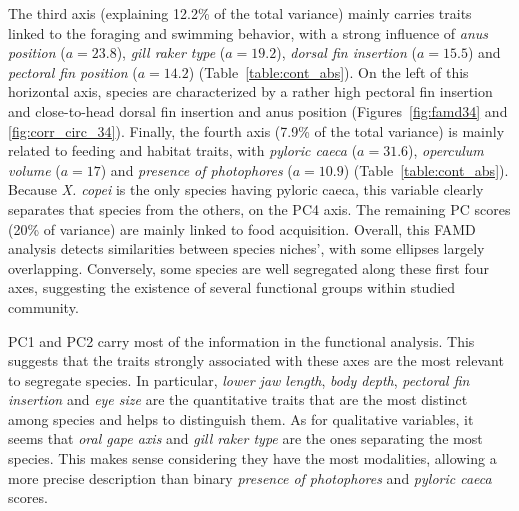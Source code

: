 The third axis (explaining 12.2\% of the total variance) mainly carries traits linked to the foraging and swimming behavior, with a strong influence of \emph{anus position} ($a = 23.8$), \emph{gill raker type} ($a = 19.2$), \emph{dorsal fin insertion} ($a = 15.5$) and \emph{pectoral fin position} ($a = 14.2$) (Table~\ref{table:cont_abs}). On the left of this horizontal axis, species are characterized by a rather high pectoral fin insertion and close-to-head dorsal fin insertion and anus position (Figures~\ref{fig:famd34} and \ref{fig:corr_circ_34}).
Finally, the fourth axis (7.9\% of the total variance) is mainly related to feeding and habitat traits, with \emph{pyloric caeca} ($a = 31.6$), \emph{operculum volume} ($a = 17$) and \emph{presence of photophores} ($a = 10.9$) (Table~\ref{table:cont_abs}). Because \textit{X. copei} is the only species having pyloric caeca, this variable clearly separates that species from the others, on the PC4 axis. The remaining PC scores (20\% of variance) are mainly linked to food acquisition. Overall, this FAMD analysis detects similarities between species niches', with some ellipses largely overlapping. Conversely, some species are well segregated along these first four axes, suggesting the existence of several functional groups within studied community. 

PC1 and PC2 carry most of the information in the functional analysis. This suggests that the traits strongly associated with these axes are the most relevant to segregate species. In particular, \emph{lower jaw length}, \emph{body depth}, \emph{pectoral fin insertion} and \emph{eye size} are the quantitative traits that are the most distinct among species and helps to distinguish them. As for qualitative variables, it seems that \emph{oral gape axis} and \emph{gill raker type} are the ones separating the most species. This makes sense considering they have the most modalities, allowing a more precise description than binary \emph{presence of photophores} and \emph{pyloric caeca} scores. 


